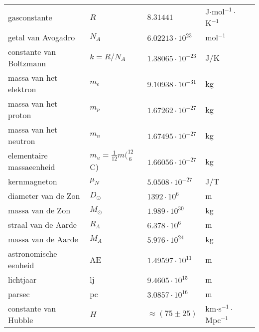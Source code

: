 \documentclass[dutch]{report}
\begin{document}
{\begin{tabular}{ l | l l l l}
        gasconstante & $R$ & $8.31441$ &J$\cdot$mol$^{-1}\cdot$K$^{-1}$ & \\
        getal van Avogadro & $N_{A}$ & $6.02213\cdot10^{23}$&mol$^{-1}$ & \\
        constante van Boltzmann & $k=R/N_{A}$ & $1.38065\cdot10^{-23}$ & J/K & \\
        \hline
        massa van het elektron & $m_{
            e}$ & $9.10938\cdot10^{-31}$ & kg & \\
        massa van het proton & $m_{p}$ & $1.67262\cdot10^{-27}$ & kg & \\
        massa van het neutron & $m_{n}$ & $1.67495\cdot10^{-27}$ & kg & \\
        elementaire massaeenheid & $m_{
            u}=\frac{1}{12}m(^{12}_{~6}$C)&$1.66056\cdot10^{-27}$ & kg & \\
        kernmagneton & $\mu_{N}$ & $5.0508\cdot10^{-27}$ & J/T\\
        \hline
        diameter van de Zon & $D_\odot$ & $1392\cdot10^6$ & m & \\
        massa van de Zon & $M_\odot$ & $1.989\cdot10^{30}$ & kg & \\
        straal van de Aarde & $R_{A}$ & $6.378\cdot10^6$ & m & \\
        massa van de Aarde & $M_{A}$ & $5.976\cdot10^{24}$ & kg & \\
        astronomische eenheid & AE & $1.49597\cdot10^{11}$ & m & \\
        lichtjaar & lj & $9.4605\cdot10^{15}$ & m & \\
        parsec & pc & $3.0857\cdot10^{16}$ & m & \\
        constante van Hubble & $H$ & $\approx(75\pm25)$ & km$\cdot$s$^{-1}\cdot$Mpc$^{-1}$
        & \\
        \hline
    \end{tabular}
}
\end{document}

